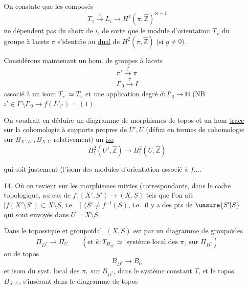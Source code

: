 
On constate que les composés
\[
T_\pi \xrightarrow{\sim} L_i \longrightarrow
H^2(\pi,\widehat{\mathbb Z})^{\otimes-1}
\]
ne dépendent pas du choix de $i$, de sorte que le module d'orientation $T_\pi$ du groupe  à lacets $\pi$ s'identifie au \uline{dual} de $H^2(\pi,\widehat{\mathbb Z})$ (si $g\ne0$).

Considérons maintenant un hom. de groupes à lacets
\[
\begin{gathered}
\pi'\xrightarrow{f}\pi\\
I'_0\xrightarrow{\tau}I
\end{gathered}
\]
associé à un isom $T_{\pi'}\simeq T_\pi$ et une application degré
$d:I'_0\longrightarrow\mathbb N$
(NB $i'\in I'\setminus I'_0\longrightarrow f(L'_{i'})=(1)$.

On voudrait en déduire un diagramme de morphismes de topos
et un hom \uline{trace} sur la cohomologie à supports propres de $U',U$ (défini en termes de cohomologie sur $B_{X',U'}, B_{X,U}$ relativement)
   un \uline{iso}
\[
H^2_!(U',\widehat{\mathbb Z})\longrightarrow
H^2_!(U,\widehat{\mathbb Z})
\]


qui soit justement  (l'isom des modules d'orientation associé à $f$....

14. Où on revient sur les morphismes \uline{mixtes} (correspondants, dans le cadre topologique, au cas de
$f:(X',S')\longrightarrow(X,S)$ tels que l'on ait
$[f(X'\setminus S')\subset X\setminus S$, i.e.\  $]$
 ($S'\ne f^{-1}(S)$, i.e.\ il y a des pts de $\unsure{S'|S}$ qui sont envoyés dans $U=X\setminus S$.

Dans le   topossique et groupoïdal, $(X,S)$ est   par un diagramme de groupoïdes
\[
\Pi_{D^*}\longrightarrow\Pi_U
\qquad
(\text{et }k:T_{\Pi_{D^*}}\simeq
\text{ système local des }\pi_1\text{ sur }\Pi_{D^*})
\]
ou de topos
\[
B_{D^*}\longrightarrow B_U
\]
et  isom  du syst. local des $\pi_1$ sur $B_{D^*}$, dans le système  constant $T$,
et le topos $B_{X,U}$, s'insérant dans le diagramme  de topos

